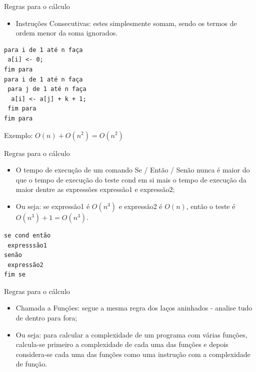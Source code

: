 \documentclass[12pt,table,xcolor={dvipsnames}]{beamer}
\begin{document}
\begin{frame}[fragile]{Regras para o cálculo}
\begin{itemize}
\item Instruções Consecutivas: estes simplesmente somam, sendo os termos de ordem menor da soma ignorados.
\end{itemize}
\begin{lstlisting}
para i de 1 até n faça
 a[i] <- 0;
fim para
para i de 1 até n faça
 para j de 1 até n faça
  a[i] <- a[j] + k + 1;
 fim para
fim para
\end{lstlisting}
Exemplo: $O(n) + O(n^2) = O(n^2)$
\end{frame}

\begin{frame}[fragile]{Regras para o cálculo}
\begin{itemize}
\item O tempo de execução de um comando Se / Então / Senão nunca é maior do que o tempo de execução do teste cond em si mais o tempo de execução da maior dentre as expressões expressão1 e expressão2;
\item Ou seja: se expressão1 é $O(n^3)$  e expressão2 é $O(n)$, então o teste é $O(n^3) + 1 = O(n^3)$.
\end{itemize}
\begin{lstlisting}
se cond então
 expresssão1
senão
 expressão2
fim se
\end{lstlisting}
\end{frame}

\begin{frame}[fragile]{Regras para o cálculo}
\begin{itemize}
\item Chamada a Funções: segue a mesma regra dos laços aninhados - analise tudo de dentro para fora; 
\item Ou seja: para calcular a complexidade de um programa com várias funções, calcula-se primeiro a complexidade de cada uma das funções e depois considera-se cada uma das funções como uma instrução com a complexidade de função.
\end{itemize}
\end{frame}
\end{document}
